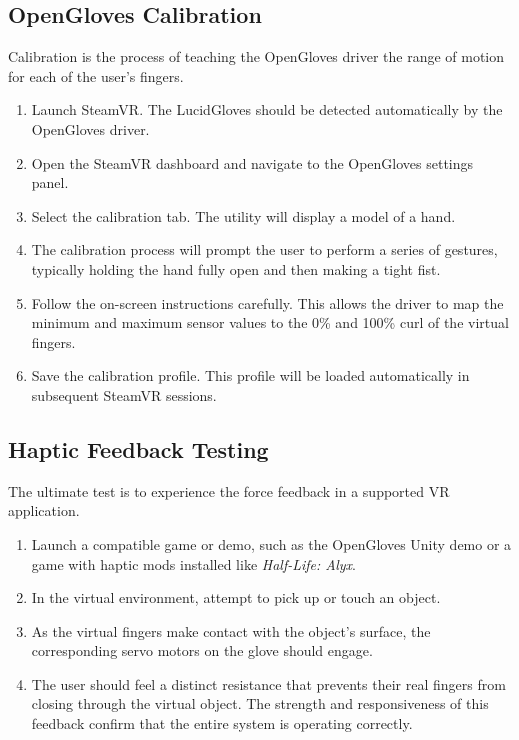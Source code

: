 \documentclass{article}
\begin{document}
\subsection{OpenGloves Calibration}
Calibration is the process of teaching the OpenGloves driver the range of motion for each of the user's fingers.
\begin{enumerate}
    \item Launch SteamVR. The LucidGloves should be detected automatically by the OpenGloves driver.
    \item Open the SteamVR dashboard and navigate to the OpenGloves settings panel.
    \item Select the calibration tab. The utility will display a model of a hand.
    \item The calibration process will prompt the user to perform a series of gestures, typically holding the hand fully open and then making a tight fist.
    \item Follow the on-screen instructions carefully. This allows the driver to map the minimum and maximum sensor values to the 0\% and 100\% curl of the virtual fingers.
    \item Save the calibration profile. This profile will be loaded automatically in subsequent SteamVR sessions.
\end{enumerate}

\subsection{Haptic Feedback Testing}
The ultimate test is to experience the force feedback in a supported VR application.
\begin{enumerate}
    \item Launch a compatible game or demo, such as the OpenGloves Unity demo or a game with haptic mods installed like \textit{Half-Life: Alyx}.
    \item In the virtual environment, attempt to pick up or touch an object.
    \item As the virtual fingers make contact with the object's surface, the corresponding servo motors on the glove should engage.
    \item The user should feel a distinct resistance that prevents their real fingers from closing through the virtual object. The strength and responsiveness of this feedback confirm that the entire system is operating correctly.
\end{enumerate}
\end{document}
